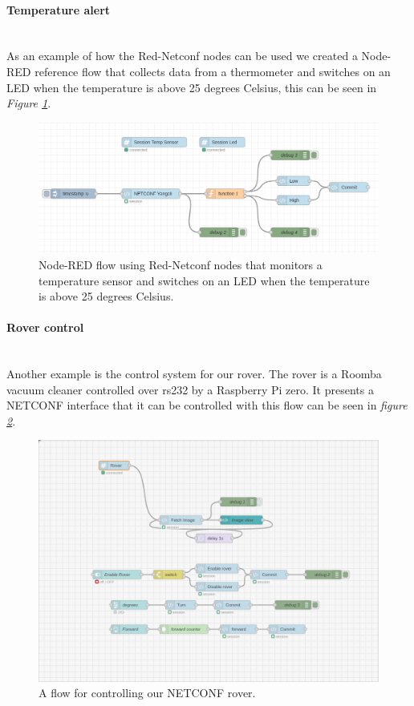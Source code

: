 \documentclass[12pt]{article}
\newcommand{\subsubsubsection}[1]{\paragraph{#1}\mbox{}\\}
\begin{document}
\subsubsubsection{Temperature alert}
As an example of how the Red-Netconf nodes can be used we created
a Node-RED reference flow that collects data from a thermometer and switches on an LED
when the temperature is above 25 degrees Celsius, this can be seen in \textit{Figure \ref{fig:red-netconf}}.

\newpage

\begin{figure}
  \centering
  \includegraphics[width=\textwidth]{red-netconf.png}
  \caption{Node-RED flow using Red-Netconf nodes that monitors a temperature sensor and 
  switches on an LED when the temperature is above 25 degrees Celsius.}
  \label{fig:red-netconf}
\end{figure}

\subsubsubsection{Rover control}
Another example is the control system for our rover. The rover is a Roomba vacuum cleaner controlled over rs232
by a Raspberry Pi zero. It presents a NETCONF interface that it can be controlled with this flow can be seen in 
\textit{figure \ref{fig:rover}}.

\begin{figure}
  \centering
  \includegraphics[width=\textwidth]{rover.png}
  \caption{A flow for controlling our NETCONF rover.}
  \label{fig:rover}
\end{figure}
\end{document}
